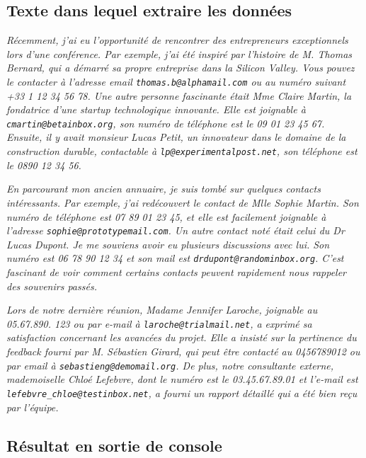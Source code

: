 \subsection*{Texte dans lequel extraire les données}
{\itshape Récemment, j'ai eu l'opportunité de rencontrer des entrepreneurs exceptionnels lors d'une conférence. Par exemple, j'ai été inspiré par l'histoire de M. Thomas Bernard, qui a démarré sa propre entreprise dans la Silicon Valley. Vous pouvez le contacter à l'adresse email \texttt{thomas.b@alphamail.com} ou au numéro suivant +33 1 12 34 56 78. Une autre personne fascinante était Mme Claire Martin, la fondatrice d'une startup technologique innovante. Elle est joignable à \texttt{cmartin@betainbox.org}, son numéro de téléphone est le 09 01 23 45 67. Ensuite, il y avait monsieur Lucas Petit, un innovateur dans le domaine de la construction durable, contactable à \texttt{lp@experimentalpost.net}, son téléphone est le 0890 12 34 56.}
\medskip

{\itshape En parcourant mon ancien annuaire, je suis tombé sur quelques contacts intéressants. Par exemple, j'ai redécouvert le contact de Mlle Sophie Martin. Son numéro de téléphone est 07 89 01 23 45, et elle est facilement joignable à l'adresse \texttt{sophie@prototypemail.com}. Un autre contact noté était celui du Dr Lucas Dupont. Je me souviens avoir eu plusieurs discussions avec lui. Son numéro est 06 78 90 12 34 et son mail est \texttt{drdupont@randominbox.org}. C'est fascinant de voir comment certains contacts peuvent rapidement nous rappeler des souvenirs passés.}
\medskip

{\itshape Lors de notre dernière réunion, Madame Jennifer Laroche, joignable au 05.67.890. 123 ou par e-mail à \texttt{laroche@trialmail.net}, a exprimé sa satisfaction concernant les avancées du projet. Elle a insisté sur la pertinence du feedback fourni par M. Sébastien Girard, qui peut être contacté au 0456789012 ou par email à \texttt{sebastieng@demomail.org}. De plus, notre consultante externe, mademoiselle Chloé Lefebvre, dont le numéro est le 03.45.67.89.01 et l'e-mail est \texttt{lefebvre\_chloe@testinbox.net}, a fourni un rapport détaillé qui a été bien reçu par l'équipe.}
\medskip

\subsection*{Résultat en sortie de console}
\medskip

